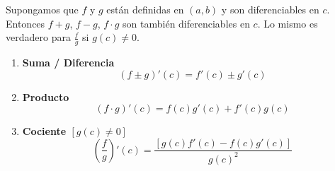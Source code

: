 \begin{teorema}
Supongamos que $f$ y $g$ están definidas en $(a, b)$ y son diferenciables en $c$. Entonces $f + g$, $f - g$, $f \cdot g$ son también diferenciables en $c$. Lo mismo es verdadero para $\frac{f}{g}$ si $g(c) \neq 0$.

\begin{enumerate}[label=\alph*)]
    \item \textbf{Suma / Diferencia}
    \[(f \pm g)'(c) = f'(c) \pm g'(c)\]
    
    \item \textbf{Producto}
    \[(f \cdot g)'(c) = f(c)g'(c) + f'(c)g(c)\]
    
    \item \textbf{Cociente $[g(c) \neq 0]$}
    \[\left(\frac{f}{g}\right)'(c) = \frac{[g(c)f'(c) - f(c)g'(c)]}{g(c)^2}\]
\end{enumerate}
\end{teorema}
